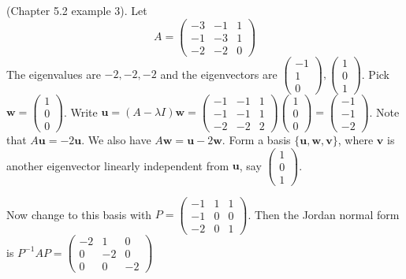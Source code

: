 \documentclass[a4paper]{article}
\begin{document}
  \begin{eg}
    (Chapter 5.2 example 3). Let
    \[
      A = \begin{pmatrix}
        -3 & -1 & 1\\
        -1 & -3 & 1\\
        -2 & -2 & 0
      \end{pmatrix}
    \]
    The eigenvalues are $-2, -2, -2$ and the eigenvectors are $
    \begin{pmatrix}
      -1 \\1 \\ 0
    \end{pmatrix}, 
    \begin{pmatrix}
      1 \\ 0 \\1
    \end{pmatrix}$. Pick $\mathbf{w} = 
    \begin{pmatrix}
      1\\0\\0
    \end{pmatrix}$. Write $\mathbf{u} = (A - \lambda I)\mathbf{w} = 
    \begin{pmatrix}
      -1 & -1 & 1\\
      -1 & -1 & 1\\
      -2 & -2 & 2
    \end{pmatrix}
    \begin{pmatrix}
      1\\0\\0
    \end{pmatrix} = 
    \begin{pmatrix}
      -1\\-1\\-2
    \end{pmatrix}$. Note that $A\mathbf{u} = -2\mathbf{u}$. We also have $A\mathbf{w} = \mathbf{u} - 2\mathbf{w}$. Form a basis $\{\mathbf{u}, \mathbf{w}, \mathbf{v}\}$, where $\mathbf{v}$ is another eigenvector linearly independent from $\mathbf{u}$, say $
    \begin{pmatrix}
      1\\0\\1
    \end{pmatrix}$.

    Now change to this basis with 
    $P = \begin{pmatrix}
      -1 & 1 & 1\\
      -1 & 0 & 0\\
      -2 & 0 & 1
    \end{pmatrix}$. Then the Jordan normal form is $P^{-1}AP = 
    \begin{pmatrix}
      -2 & 1 & 0\\
      0 & -2 & 0\\
      0 & 0 & -2
    \end{pmatrix}$
  \end{eg}
\end{document}
